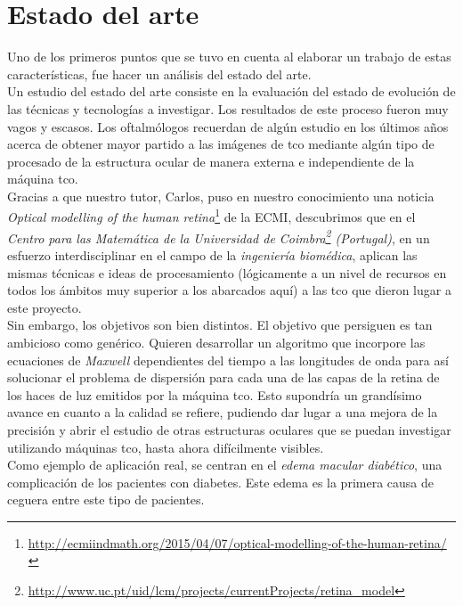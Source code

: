 \chapter{Estado del arte}
Uno de los primeros puntos que se tuvo en cuenta al elaborar un
trabajo de estas características, fue hacer un análisis del estado del arte.\\
Un estudio del estado del arte consiste en la evaluación del estado de
evolución de las técnicas y tecnologías a investigar. Los resultados
de este proceso fueron muy vagos y escasos. Los oftalmólogos recuerdan
de algún estudio en los últimos años acerca de obtener mayor partido a
las imágenes de \gls{tco} mediante algún tipo de procesado de la
estructura ocular de manera externa e independiente de la máquina \gls{tco}.\\
Gracias a que nuestro tutor, Carlos, puso en nuestro conocimiento una
noticia \emph{Optical modelling of the human
  retina}\footnote{\url{http://ecmiindmath.org/2015/04/07/optical-modelling-of-the-human-retina/}}
de la \gls{ECMI}, descubrimos que en el \emph{Centro para las
  Matemática de la Universidad de
  Coimbra\footnote{\url{http://www.uc.pt/uid/lcm/projects/currentProjects/retina\_model}}
  (Portugal)}, en un esfuerzo interdisciplinar en el campo de la
\emph{ingeniería biomédica}, aplican las mismas técnicas e ideas de
procesamiento (lógicamente a un nivel de recursos en todos los ámbitos
muy superior a los abarcados aquí) a
las \gls{tco} que dieron lugar a este proyecto. \\
Sin embargo, los objetivos son bien distintos. El objetivo que
persiguen es tan ambicioso como genérico. Quieren desarrollar un
algoritmo que incorpore las ecuaciones de \emph{Maxwell} dependientes
del tiempo a las longitudes de onda para así solucionar el problema de
dispersión para cada una de las capas de la retina de los haces de luz
emitidos por la máquina \gls{tco}. Esto supondría un grandísimo avance
en cuanto a la calidad se refiere, pudiendo dar lugar a una mejora de
la precisión y abrir el estudio de otras estructuras oculares que se
puedan investigar utilizando máquinas \gls{tco}, hasta ahora
difícilmente
visibles.\\
Como ejemplo de aplicación real, se centran en el \emph{edema macular
  diabético}, una complicación de los pacientes con diabetes. Este
edema es la primera causa de ceguera entre este tipo de pacientes.
